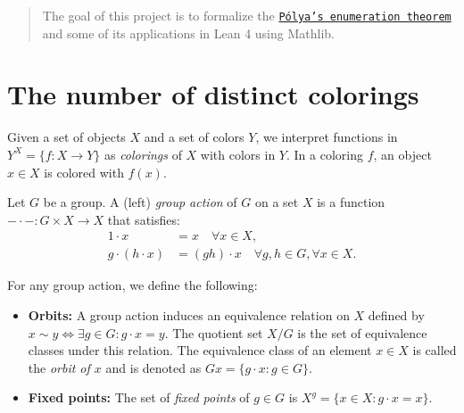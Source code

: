 %

\begin{abstract}
  The goal of this project is to formalize the \href{https://en.wikipedia.org/wiki/P%C3%B3lya_enumeration_theorem}{\texttt{Pólya's enumeration theorem}} and some of its applications in Lean 4 using Mathlib.
\end{abstract}

\section{The number of distinct colorings}

Given a set of objects $X$ and a set of colors $Y$, we interpret functions in $Y^X = \{f : X \to Y\}$ as \emph{colorings} of $X$ with colors in $Y$. In a coloring $f$, an object $x \in X$ is colored with $f(x)$.

Let $G$ be a group. A (left) \emph{group action} of $G$ on a set $X$ is a function ${-} \cdot {-} : G \times X \to X$ that satisfies:
\begin{align*}
  1 \cdot x &= x \quad \forall x \in X,\\
  g \cdot (h \cdot x) &= (gh) \cdot x \quad \forall g, h \in G, \forall x \in X.
\end{align*}

For any group action, we define the following:
\begin{itemize}
  \item \textbf{Orbits:} A group action induces an equivalence relation on $X$ defined by $x \sim y \iff \exists g \in G : g \cdot x = y$. The quotient set $X / G$ is the set of equivalence classes under this relation. The equivalence class of an element $x \in X$ is called the \emph{orbit of $x$} and is denoted as $Gx = \{g \cdot x : g \in G\}$.
  
  \item \textbf{Fixed points:} The set of \emph{fixed points} of $g \in G$ is $X^g = \{x \in X : g \cdot x = x\}$.
  
\end{itemize}

